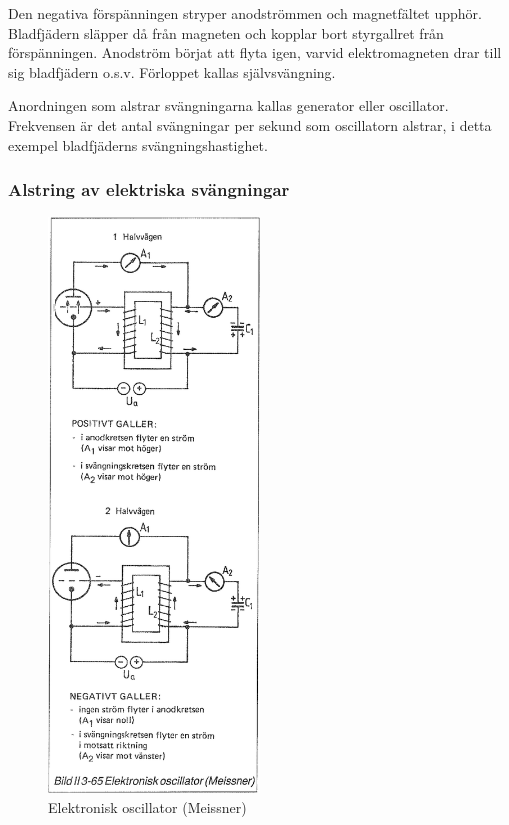 Den negativa förspänningen stryper anodströmmen och magnetfältet
upphör. Bladfjädern släpper då från magneten och kopplar bort
styrgallret från förspänningen. Anodström börjat att flyta igen,
varvid elektromagneten drar till sig bladfjädern o.s.v. Förloppet
kallas självsvängning.

Anordningen som alstrar svängningarna kallas generator eller
oscillator. Frekvensen är det antal svängningar per sekund som
oscillatorn alstrar, i detta exempel bladfjäderns svängningshastighet.

\subsubsection{Alstring av elektriska svängningar}

\begin{figure}
\includegraphics[width=0.5\textwidth]{images/bild_2_3-65}
\caption{Elektronisk oscillator (Meissner)}
\label{fig:BildII3-65}
\end{figure}

